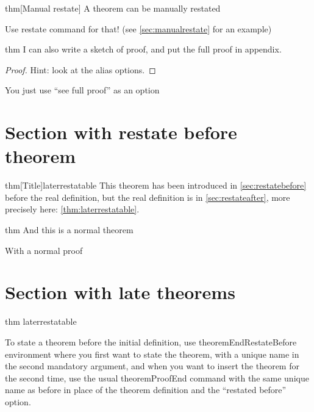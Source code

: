 \documentclass{article}
\begin{document}
\begin{theoremEnd}[restate command=mymanualrestate]{thm}[Manual restate]
  A theorem can be manually restated  
\end{theoremEnd}
\begin{proofEnd}
  Use restate command for that! (see \autoref{sec:manualrestate} for an example)
\end{proofEnd}

\begin{theoremEnd}{thm}
  I can also write a sketch of proof, and put the full proof in appendix.
\end{theoremEnd}
\begin{proof}
  Hint: look at the alias options.
\end{proof}
\begin{proofEnd}
  You just use ``see full proof'' as an option
\end{proofEnd}

\section{Section with restate before theorem}\label{sec:restatebefore}

\begin{theoremEndRestateBefore}{thm}[Title]{laterrestatable}
  \label{thm:laterrestatable}
  This theorem has been introduced in \autoref{sec:restatebefore} before the real definition, but the real definition is in \autoref{sec:restateafter}, more precisely here: \autoref{thm:laterrestatable}.
\end{theoremEndRestateBefore}


\begin{theoremEnd}{thm}
  And this is a normal theorem  
\end{theoremEnd}
\begin{proofEnd}
  With a normal proof  
\end{proofEnd}


\section{Section with late theorems}\label{sec:restateafter}
\begin{theoremEnd}{thm}
  laterrestatable
\end{theoremEnd}
\begin{proofEnd}
  To state a theorem before the initial definition, use theoremEndRestateBefore environment where you first want to state the theorem, with a unique name in the second mandatory argument, and when you want to insert the theorem for the second time, use the usual theoremProofEnd command with the same unique name as before in place of the theorem definition and the ``restated before'' option.  
\end{proofEnd}
\end{document}
